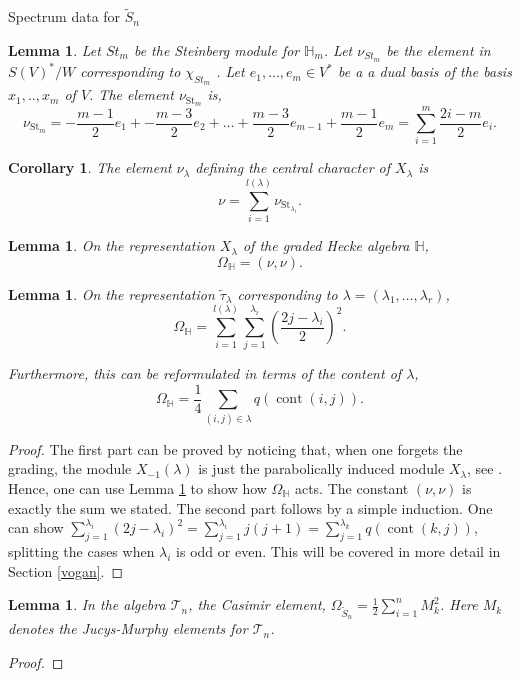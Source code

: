\documentclass[a4paper,10pt]{amsart}
\newtheorem{corollary}[theorem]{Corollary}
\newtheorem{lemma}[theorem]{Lemma}
\DeclareMathOperator{\cont}{cont}
\DeclareMathOperator{\St}{St}
\begin{document}
\begin{section}{Spectrum data for $\tilde{S}_n$}
\begin{lemma} Let $St_m$ be the Steinberg module for $\mathbb{H}_m$. Let $\nu_{St_m}$ be the element in $S(V)^*/W$ corresponding to $\chi_{St_m}$ . Let $e_1,\ldots ,e_m \in V^*$ be a a dual basis of the basis  $x_1,..,x_m$ of $V$. 
The element $\nu_{\St_m}$ is,
$$\nu_{\St_m} = -\frac{m-1}{2}e_1 + -\frac{m-3}{2}e_2+\ldots +\frac{m-3}{2}e_{m-1} + \frac{m-1}{2}e_m = \sum_{i=1}^m \frac{2i-m}{2}e_i.$$
\end{lemma} 

 \begin{corollary} The element $\nu_\lambda$ defining the central character of $X_\lambda$ is 
$$\nu = \sum_{i=1}^{l(\lambda)} \nu_{\St_{\lambda_i}}.$$ \end{corollary}

 \begin{lemma}\label{HOmega} \cite[2.5]{BCT12} On the representation  $X_\lambda$ of the graded Hecke algebra $\mathbb{H}$,
 $$\Omega_\mathbb{H} = ( \nu , \nu ).$$
 \end{lemma} 

\begin{lemma}\label{content} On the representation $\tilde{\tau}_\lambda$ corresponding to $\lambda = (\lambda_1,\ldots ,\lambda_r)$, 
$$\Omega_\mathbb{H}  = \sum_{i=1}^{l(\lambda)} \sum_{j=1}^{\lambda_i} (\frac{2j - \lambda_i}{2})^2.$$

Furthermore, this can be reformulated in terms of the content of $\lambda$,
$$ \Omega_\mathbb{H} =\frac{1}{4} \sum_{(i,j) \in \lambda}  q(\cont(i,j)).$$\end{lemma}



\begin{proof} The first part can be proved by noticing that, when one forgets the grading, the module $X_{-1}(\lambda)$ is just the parabolically induced module $X_\lambda$, see \cite{BM83}. Hence, one can use Lemma \ref{HOmega} to show how $\Omega_\mathbb{H}$ acts. The constant $( \nu, \nu )$ is exactly the sum we  stated.
The second part follows by a simple induction. One can show $\sum_{j=1}^{\lambda_i} (2j - \lambda_i)^2= \sum_{j=1}^{\lambda_i} j(j+1) = \sum_{j=1}^{\lambda_k} q(\cont(k,j))$, splitting the cases when $\lambda_i$ is odd or even. This will be covered in more detail in Section \ref{vogan}. \end{proof} %

\begin{lemma}\label{squares} In the algebra $\mathcal{T}_n$, the Casimir element, $\Omega_{\tilde{S}_n} =\frac{1}{2} \sum_{i=1}^n M_k^2$. Here  $M_k$ denotes the Jucys-Murphy elements for $\mathcal{T}_n$. \end{lemma} 
\begin{proof} 


\end{proof}
\end{section}
\end{document}

